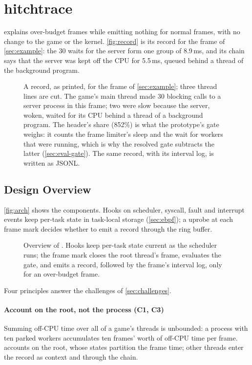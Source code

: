 \section{hitchtrace}
\label{sec:design}

\sys explains over-budget frames while emitting nothing for normal frames,
with no change to the game or the kernel. \autoref{fig:record} is its
record for the frame of \autoref{sec:example}: the 30 waits for the server
form one group of 8.9\,ms, and its chain says that the server was kept off
the CPU for 5.5\,ms, queued behind a thread of the background program.

\begin{figure}[t]
\centering

\resizebox{\textwidth}{!}{\usebox{\recordbox}}
\caption{A \sys record, as printed, for the frame of \autoref{sec:example};
three thread lines are cut. The game's main thread made 30 blocking calls
to a server process in this frame; two were slow because the server, woken,
waited for its CPU behind a thread of a background program. The header's
share (852\%) is what the prototype's gate weighs: it counts the frame
limiter's sleep and the wait for workers that were running, which is why
the resolved gate subtracts the latter (\autoref{sec:eval-gate}). The same
record, with its interval log, is written as JSONL.}
\label{fig:record}
\end{figure}

\subsection{Design Overview}

\autoref{fig:arch} shows the components. Hooks on scheduler, syscall,
fault and interrupt events keep per-task state in task-local storage
(\autoref{sec:ebpf}); a uprobe at each frame mark decides whether to emit a
record through the ring buffer.

\begin{figure}[t]
\centering
\resizebox{\textwidth}{!}{}
\caption{Overview of \sys. Hooks keep per-task state current as the
scheduler runs; the frame mark closes the root thread's frame, evaluates the
gate, and emits a record, followed by the frame's interval log, only for an
over-budget frame.}
\label{fig:arch}
\end{figure}

Four principles answer the challenges of \autoref{sec:challenges}.

\paragraph{Account on the root, not the process (C1, C3)}
Summing off-CPU time over all of a game's threads is unbounded: a process
with ten parked workers accumulates ten frames' worth of off-CPU time per
frame. \sys accounts on the root, whose states partition the frame time;
other threads enter the record as context and through the chain.

